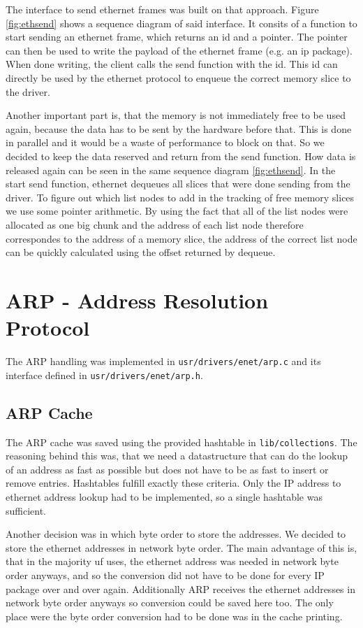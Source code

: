The interface to send ethernet frames was built on that approach. Figure \ref{fig:ethsend} shows a sequence diagram of said interface. It consits of a function to start sending an ethernet frame, which returns an id and a pointer. The pointer can then be used to write the payload of the ethernet frame (e.g. an ip package). When done writing, the client calls the send function with the id. This id can directly be used by the ethernet protocol to enqueue the correct memory slice to the driver.

Another important part is, that the memory is not immediately free to be used again, because the data has to be sent by the hardware before that. This is done in parallel and it would be a waste of performance to block on that. So we decided to keep the data reserved and return from the send function. How data is released again can be seen in the same sequence diagram \ref{fig:ethsend}. In the start send function, ethernet dequeues all slices that were done sending from the driver. To figure out which list nodes to add in the tracking of free memory slices we use some pointer arithmetic. By using the fact that all of the list nodes were allocated as one big chunk and the address of each list node therefore correspondes to the address of a memory slice, the address of the correct list node can be quickly calculated using the offset returned by dequeue.

\section{ARP - Address Resolution Protocol}
The ARP handling was implemented in \verb|usr/drivers/enet/arp.c| and its interface defined in \verb|usr/drivers/enet/arp.h|.

\subsection{ARP Cache}
\label{sec:arpcache}
The ARP cache was saved using the provided hashtable in \verb|lib/collections|. The reasoning behind this was, that we need a datastructure that can do the lookup of an address as fast as possible but does not have to be as fast to insert or remove entries. Hashtables fulfill exactly these criteria. Only the IP address to ethernet address lookup had to be implemented, so a single hashtable was sufficient.

Another decision was in which byte order to store the addresses. We decided to store the ethernet addresses in network byte order. The main advantage of this is, that in the majority uf uses, the ethernet address was needed in network byte order anyways, and so the conversion did not have to be done for every IP package over and over again. Additionally ARP receives the ethernet addresses in network byte order anyways so conversion could be saved here too. The only place were the byte order conversion had to be done was in the cache printing.

